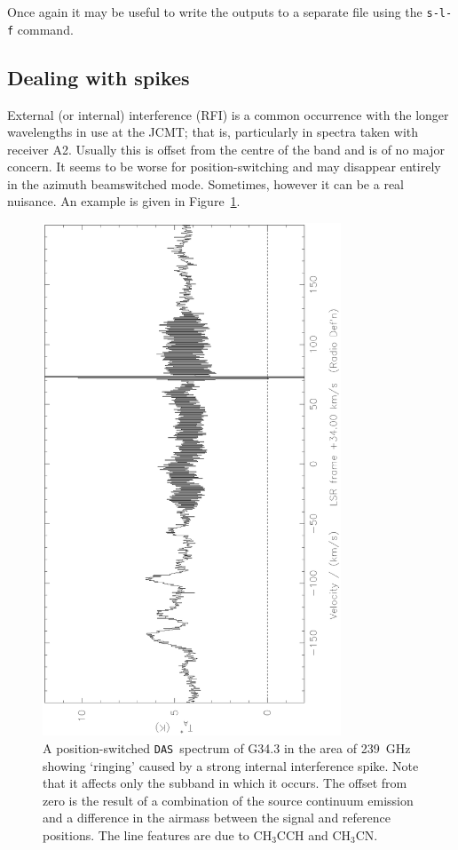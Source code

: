 \documentclass[11pt,twoside]{article}
\newcommand{\das}{{\tt DAS}}
\begin{document}
Once again it may be useful to write the outputs to a separate file
using the {\tt s-l-f} command.

\subsection{Dealing with spikes}
\label{sec:spike-removal}
External (or internal) interference (RFI) is a common occurrence with
the longer wavelengths in use at the JCMT; that is, particularly in
spectra taken with receiver A2. Usually this is offset from the centre
of the band and is of no major concern. It seems to be worse for
position-switching and may disappear entirely in the azimuth
beamswitched mode. Sometimes, however it can be a real nuisance. An
example is given in Figure~\ref{fig:spikes}.

\begin{figure}[htb]
\centering
\includegraphics[angle=-90,width=3.5in]{sc8_spiked.ps}
\vspace*{-0.5cm}
\begin{center}
\begin{minipage}[t]{5.5in}
\caption[`Ringing' in a spectrum]
{\small{A position-switched \das\ spectrum of G34.3 in the area of
239~GHz showing `ringing' caused by a strong internal interference
spike. Note that it affects only the subband in which it occurs. The
offset from zero is the result of a combination of the source
continuum emission and a difference in the airmass between the signal
and reference positions. The line features are due to CH$_3$CCH and
CH$_3$CN.  }}
\label{fig:spikes}
\end{minipage}
\end{center}
\end{figure}
\end{document}
